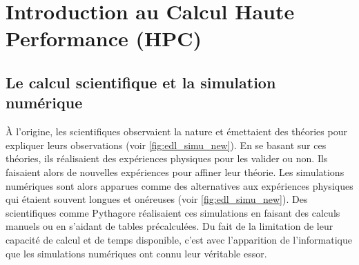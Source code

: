\section{Introduction au Calcul Haute Performance (HPC)}\label{sec:hpc_intro}


\subsection{Le calcul scientifique et la simulation numérique}

    À l'origine, les scientifiques observaient la nature et émettaient des théories pour expliquer leurs observations (voir \autoref{fig:edl_simu_new}). En se basant sur ces théories, ils réalisaient des expériences physiques pour les valider ou non. Ils faisaient alors de nouvelles expériences pour affiner leur théorie. Les simulations numériques sont alors apparues comme des alternatives aux expériences physiques qui étaient souvent longues et onéreuses (voir \autoref{fig:edl_simu_new}). Des scientifiques comme Pythagore réalisaient ces simulations en faisant des calculs manuels ou en s'aidant de tables précalculées. Du fait de la limitation de leur capacité de calcul et de temps disponible, c'est avec l'apparition de l'informatique que les simulations numériques ont connu leur véritable essor.
    

